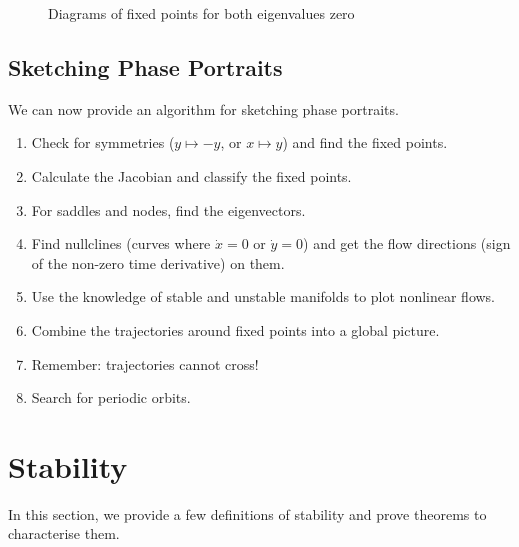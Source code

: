 \documentclass[../Main.tex]{subfiles}
\begin{document}
\begin{figure}
    \caption{Diagrams of fixed points for both eigenvalues zero}
    \label{figDoubleZeroEval}
\end{figure}
\subsection{Sketching Phase Portraits}
We can now provide an algorithm for sketching phase portraits.
\begin{enumerate}
    \item Check for symmetries ($y \mapsto -y$, or $x\mapsto y$) and find the fixed points.
    \item Calculate the Jacobian and classify the fixed points.
    \item For saddles and nodes, find the eigenvectors.
    \item Find nullclines (curves where $\dot{x} = 0$ or $\dot{y} = 0$) and get the flow directions (sign of the non-zero time derivative) on them.
    \item Use the knowledge of stable and unstable manifolds to plot nonlinear flows.
    \item Combine the trajectories around fixed points into a global picture.
    \item Remember: trajectories cannot cross!
    \item Search for periodic orbits.
\end{enumerate}
\section{Stability}
In this section, we provide a few definitions of stability and prove theorems to characterise them.
\end{document}
